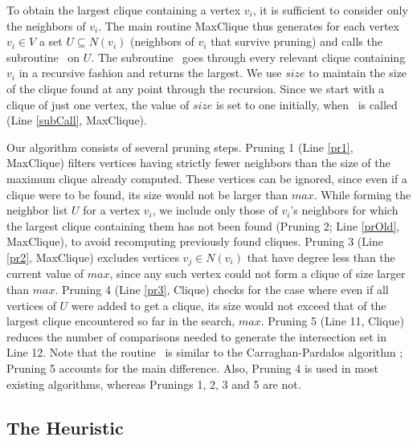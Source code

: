 To obtain the largest clique containing a vertex $v_i$, 
it is sufficient to consider only the neighbors of $v_i$. 
The main routine {\sc MaxClique} thus generates  for each 
vertex $v_i \in V$ a set $U \subseteq N(v_i)$ 
(neighbors of $v_i$ that survive pruning) and calls the subroutine \clq\ on $U$.  
The subroutine \clq\ goes through every relevant clique containing $v_i$ 
in a recursive fashion and returns the largest.
We use $size$ to maintain the size of the clique found at any point through the recursion.
Since we start with a clique of just one vertex, the value of $size$ is set to one initially, 
when \clq\ is called (Line \ref{subCall}, {\sc MaxClique}).


Our algorithm consists of several pruning steps.
Pruning 1 (Line \ref{pr1}, {\sc MaxClique}) 
filters vertices having strictly fewer neighbors than the size of the maximum clique already computed. These vertices can be ignored, since even if a clique were to be found, its size would not be larger than $max$.
While forming the neighbor list $U$ for a vertex $v_i$, we include only those of $v_i$'s 
neighbors for which the largest clique containing them has not been found 
(Pruning 2; Line \ref{prOld}, {\sc MaxClique}), 
to avoid recomputing previously found cliques.  
Pruning 3 (Line \ref{pr2}, {\sc MaxClique})
excludes vertices $v_j \in N(v_i)$  that have degree less than the current value of $max$, since any such vertex could not form a clique of size larger than $max$.
Pruning 4 (Line \ref{pr3}, {\sc Clique})
checks for the case where even if all vertices of $U$ were added to get a clique, its size would not exceed that of the largest clique encountered so far in the search, $max$. 
Pruning 5 (Line 11, {\sc Clique})
reduces the number of comparisons needed to generate the intersection set in Line 12.
Note that the routine \clq\ is similar to the 
Carraghan-Pardalos algorithm \cite{pardalos}; Pruning 5 accounts for the main difference.
Also, Pruning 4 is used in most existing algorithms, whereas Prunings 1, 2, 3 and 5 are not.

\subsection{The Heuristic}
\label{subsec:heuristic}

